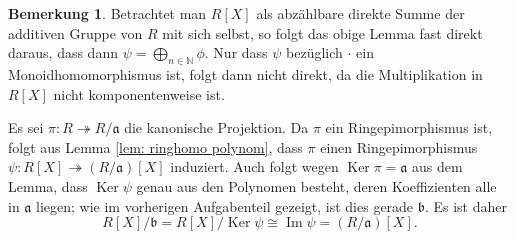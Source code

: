 \documentclass[a4paper,10pt]{article}
\theoremstyle{definition}
\newtheorem{bem}[beh]{Bemerkung}
\newcommand{\N}{\mathbb{N}}
\newcommand{\mf}[1]{\mathfrak{#1}}
\newcommand{\Img}{\operatorname{Im}}
\newcommand{\Ker}{\operatorname{Ker}}
\begin{document}
\begin{bem}
  Betrachtet man $R[X]$ als abzählbare direkte Summe der additiven Gruppe von $R$ mit sich selbst, so folgt das obige Lemma fast direkt daraus, dass dann $\psi = \bigoplus_{n \in \N} \phi$. Nur dass $\psi$ bezüglich $\cdot$ ein Monoidhomomorphismus ist, folgt dann nicht direkt, da die Multiplikation in $R[X]$ nicht komponentenweise ist.
\end{bem}

Es sei $\pi : R \twoheadrightarrow R/\mf{a}$ die kanonische Projektion. Da $\pi$ ein Ringepimorphismus ist, folgt aus Lemma \ref{lem: ringhomo polynom}, dass $\pi$ einen Ringepimorphismus $\psi: R[X] \twoheadrightarrow (R/\mf{a})[X]$ induziert. Auch folgt wegen $\Ker \pi = \mf{a}$ aus dem Lemma, dass $\Ker \psi$ genau aus den Polynomen besteht, deren Koeffizienten alle in $\mf{a}$ liegen; wie im vorherigen Aufgabenteil gezeigt, ist dies gerade $\mf{b}$. Es ist daher
\[
 R[X]/\mf{b} = R[X]/\Ker\psi \cong \Img\psi = (R/\mf{a})[X].
\]
\end{document}
